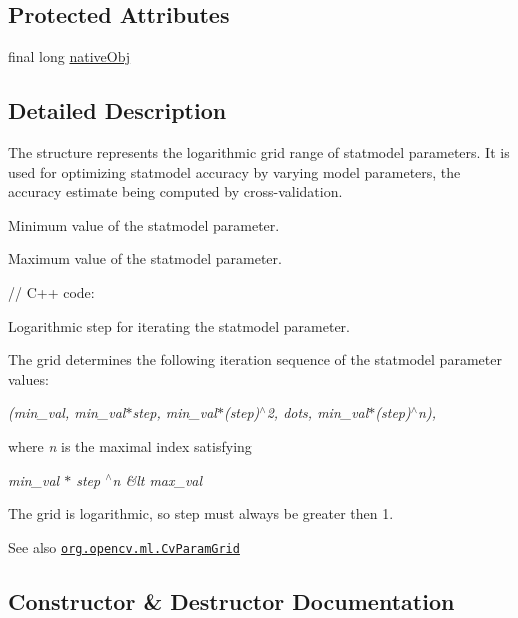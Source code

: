 \subsection*{Protected Attributes}
\begin{DoxyCompactItemize}
\item 
final long \mbox{\hyperlink{classorg_1_1opencv_1_1ml_1_1_cv_param_grid_a0618043fc753d4986cdcfe1d8538e83f}{native\+Obj}}
\end{DoxyCompactItemize}


\subsection{Detailed Description}
The structure represents the logarithmic grid range of statmodel parameters. It is used for optimizing statmodel accuracy by varying model parameters, the accuracy estimate being computed by cross-\/validation.

Minimum value of the statmodel parameter.

Maximum value of the statmodel parameter. {\ttfamily }

{\ttfamily }

{\ttfamily }

{\ttfamily // C++ code\+:}

{\ttfamily }

{\ttfamily }

{\ttfamily Logarithmic step for iterating the statmodel parameter.}

{\ttfamily }

{\ttfamily }

{\ttfamily The grid determines the following iteration sequence of the statmodel parameter values\+: }

{\itshape (min\+\_\+val, min\+\_\+val$\ast$step, min\+\_\+val$\ast$(step)$^\wedge$2, dots, min\+\_\+val$\ast$(step)$^\wedge$n),}

where {\itshape n} is the maximal index satisfying

{\itshape min\+\_\+val $\ast$ step $^\wedge$n \&lt max\+\_\+val}

The grid is logarithmic, so {\ttfamily step} must always be greater then 1.

\begin{DoxySeeAlso}{See also}
\href{http://docs.opencv.org/modules/ml/doc/support_vector_machines.html#cvparamgrid}{\tt org.\+opencv.\+ml.\+Cv\+Param\+Grid} 
\end{DoxySeeAlso}


\subsection{Constructor \& Destructor Documentation}
\mbox{\label{classorg_1_1opencv_1_1ml_1_1_cv_param_grid_a3cb0b612b0dfdba5b7dc81579dce10a7}} 
